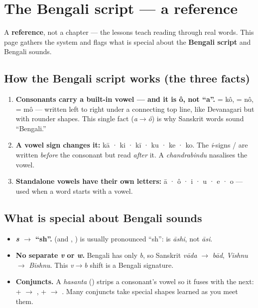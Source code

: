 
\chapter*{The Bengali script --- a reference}

A \textbf{reference}, not a chapter — the lessons teach reading through real words. This page gathers the system and flags what is special about the \textbf{Bengali script} and Bengali sounds.

\section*{How the Bengali script works (the three facts)}

\begin{enumerate}
\raggedright
\setlength{\itemsep}{0.35em}
  \item \textbf{Consonants carry a built-in vowel — and it is ô, not \textquotedblleft{}a\textquotedblright{}.}  = kô,  = nô,  = mô — written left to right under a connecting top line, like Devanagari but with rounder shapes. This single fact (\emph{a$\to$ô}) is why Sanskrit words sound \textquotedblleft{}Bengali.\textquotedblright{}
  \item \textbf{A vowel sign changes it:}  kā ·  ki ·  kī ·  ku ·  ke ·  ko. The \emph{i}-signs  /  are written \emph{before} the consonant but read \emph{after} it. A \emph{chandrabindu}  nasalises the vowel.
  \item \textbf{Standalone vowels have their own letters:}  ā ·  ô ·  i ·  u ·  e ·  o — used when a word starts with a vowel.
\end{enumerate}

\section*{What is special about Bengali sounds}

\begin{itemize}
\raggedright
\setlength{\itemsep}{0.35em}
  \item \textbf{\emph{s} $\to$ \textquotedblleft{}sh\textquotedblright{}.}  (and , ) is usually pronounced \textquotedblleft{}sh\textquotedblright{}:  is \emph{āshi}, not \emph{āsi}.
  \item \textbf{No separate \emph{v} or \emph{w}.} Bengali has only  \emph{b}, so Sanskrit \emph{vāda} $\to$ \emph{bād}, \emph{Vishnu} $\to$ \emph{Bishnu}. This \emph{v$\to$b} shift is a Bengali signature.
  \item \textbf{Conjuncts.} A \emph{hasanta} () strips a consonant's vowel so it fuses with the next:  +  $\to$ ,  +  $\to$ . Many conjuncts take special shapes learned as you meet them.
\end{itemize}

